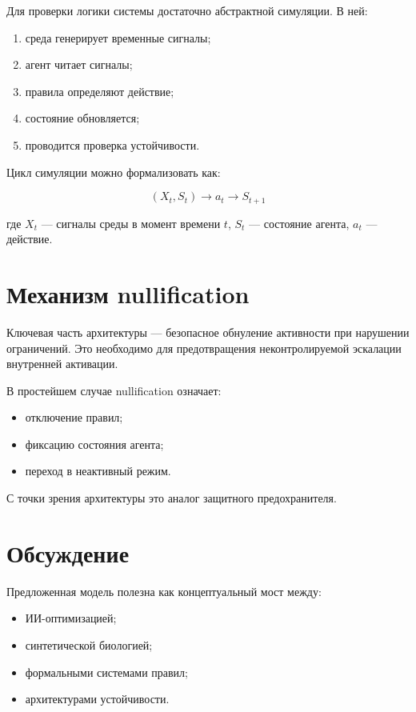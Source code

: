 \documentclass[12pt,a4paper]{article}
\begin{document}
Для проверки логики системы достаточно абстрактной симуляции. В ней:
\begin{enumerate}
    \item среда генерирует временные сигналы;
    \item агент читает сигналы;
    \item правила определяют действие;
    \item состояние обновляется;
    \item проводится проверка устойчивости.
\end{enumerate}

Цикл симуляции можно формализовать как:

\[
(X_t, S_t) \rightarrow a_t \rightarrow S_{t+1}
\]

где $X_t$ --- сигналы среды в момент времени $t$, $S_t$ --- состояние агента, $a_t$ --- действие.

\section{Механизм nullification}

Ключевая часть архитектуры --- безопасное обнуление активности при нарушении ограничений. Это необходимо для предотвращения неконтролируемой эскалации внутренней активации.

В простейшем случае nullification означает:
\begin{itemize}
    \item отключение правил;
    \item фиксацию состояния агента;
    \item переход в неактивный режим.
\end{itemize}

С точки зрения архитектуры это аналог защитного предохранителя.

\section{Обсуждение}

Предложенная модель полезна как концептуальный мост между:
\begin{itemize}
    \item ИИ-оптимизацией;
    \item синтетической биологией;
    \item формальными системами правил;
    \item архитектурами устойчивости.
\end{itemize}
\end{document}
